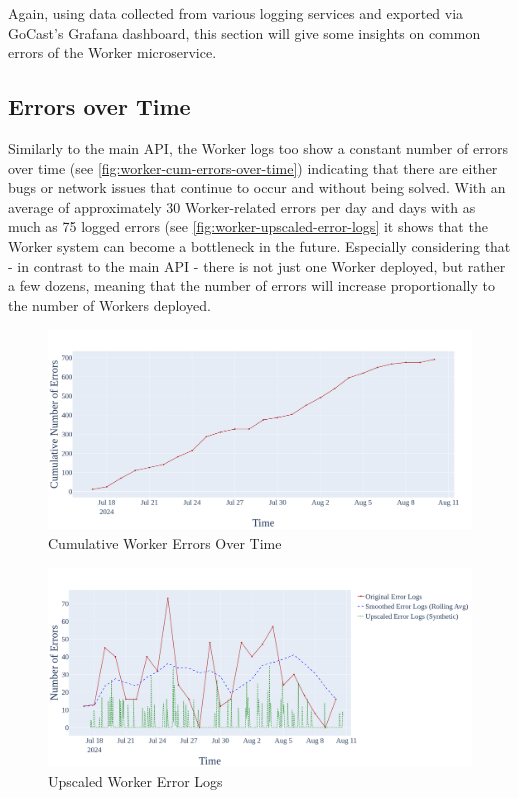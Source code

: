 Again, using data collected from various logging services and exported via GoCast's Grafana dashboard, this section will give some insights on common errors of the Worker microservice.

\subsection{Errors over Time}

Similarly to the main \ac{API}, the Worker logs too show a constant number of errors over time (see \autoref{fig:worker-cum-errors-over-time}) indicating that there are either bugs or network issues that continue to occur and without being solved. With an average of approximately 30 Worker-related errors per day and days with as much as 75 logged errors (see \autoref{fig:worker-upscaled-error-logs} it shows that the Worker system can become a bottleneck in the future. Especially considering that - in contrast to the main \ac{API} - there is not just one Worker deployed, but rather a few dozens, meaning that the number of errors will increase proportionally to the number of Workers deployed. 

\begin{figure}[htpb]
    \centering
    \includegraphics[width=\linewidth]{images/plots/worker/cum_errors_over_time.png}
    \caption[Cumulative Worker Errors Over Time]{Cumulative Worker Errors Over Time}\label{fig:worker-cum-errors-over-time}
\end{figure}

\begin{figure}[htpb]
    \centering
    \includegraphics[width=\linewidth]{images/plots/worker/upscaled_error_logs.png}
    \caption[Upscaled Worker Error Logs]{Upscaled Worker Error Logs}\label{fig:worker-upscaled-error-logs}
\end{figure}

